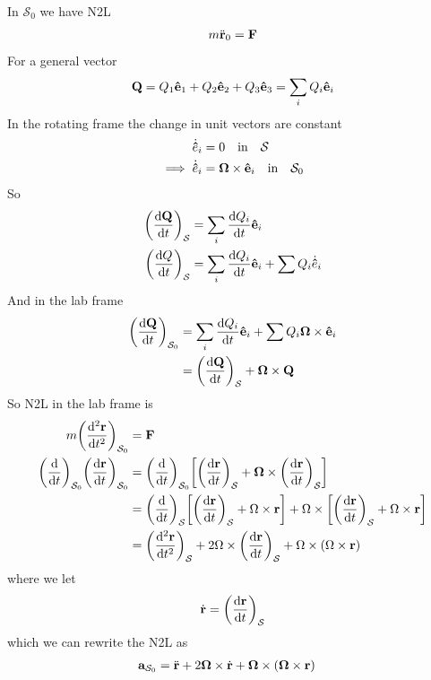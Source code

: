 \documentclass[../main.tex]{subfiles}
\begin{document}
In $\mathcal{S}_0$ we have N2L
\begin{align*}
    m\ddot{\vb r}_0 = \vb F
\end{align*}
For a general vector
\begin{align*}
    \vb Q = Q_1 \vu e_1 + Q_2 \vu e_2 + Q_3 \vu e_3 = \sum_i Q_i \vu e_i
\end{align*}
In the rotating frame the change in unit vectors are constant
\begin{align*}
    \dot{\vu e}_i &= 0 \qqtext{in} \mathcal{S} \\
    \implies \dot{\vu e}_i &= \vb \Omega \times \vu e_i \qqtext{in} \mathcal{S}_0
\end{align*}
So
\begin{align*}
    \qt(\dv{\vb Q}{t})_{\mathcal{S}} &= \sum_i \dv{Q_i}{t} \vu e_i \\
    \qt(\dv{Q}{t})_{\mathcal{S}} &= \sum_i \dv{Q_i}{t} \vu e_i + \sum Q_i \dot{\vu e}_i
\end{align*}
And in the lab frame
\begin{align*}
    \qt(\dv{\vb Q}{t})_{\mathcal{S}_0} &= \sum_i \dv{Q_i}{t} \vu e_i + \sum Q_i \vb \Omega \times \vu e_i \\
    &= \qt(\dv{\vb Q}{t})_{\mathcal{S}} + \vb \Omega \times \vb Q
\end{align*}
So N2L in the lab frame is
\begin{align*}
    m \qt(\dv[2]{\vb r}{t})_{\mathcal{S}_0} &= \vb F \\
    \qt(\dv{t})_{\mathcal{S}_0} \qt(\dv{\vb r}{t})_{\mathcal{S}_0} &= 
        \qt(\dv{t})_{\mathcal{S}_0} 
        \qt[\qt(\dv{\vb r}{t})_{\mathcal{S}} + \vb \Omega \times \qt(\dv{\vb r}{t})_{\mathcal{S}}] \\
    &= \qt(\dv{t})_\mathcal{S} \qt[
        \qt(\dv{\vb r}{t})_\mathcal{S} + \Omega \times \vb r
    ]
    + \Omega \times \qt[
        \qt(\dv{\vb r}{t})_\mathcal{S} + \Omega \times \vb r
    ] \\
    &= \qt(\dv[2]{\vb r}{t})_\mathcal{S} + 2\Omega \times \qt(\dv{\vb r}{t})_\mathcal{S} 
        + \Omega \times (\Omega \times \vb r)
\end{align*}
where we let
\begin{align*}
    \dot{\vb r} = \qt(\dv{\vb r}{t})_\mathcal{S}
\end{align*}
which we can rewrite the N2L as
\begin{align*}
    \vb a_{\mathcal{S}_0} &= \ddot{\vb r} + 2 \vb \Omega \times \dot{\vb r} 
        + \vb \Omega \times (\vb \Omega \times \vb r)
\end{align*}
\end{document}
